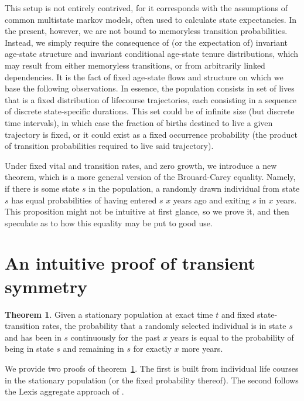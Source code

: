 \documentclass[12pt,oneside,a4paper]{article}
\theoremstyle{definition}
\newtheorem{theorem}{Theorem}[section]
\begin{document}
This setup is not entirely contrived, for it corresponds with the assumptions of
common multistate markov models, often used to calculate state expectancies.
In the present, however, we are not bound to memoryless transition probabilities.
Instead, we simply require the consequence of (or the expectation of) invariant
age-state structure and invariant conditional age-state tenure distributions, which may result from
either memoryless transitions, or from arbitrarily linked
dependencies.
It is the fact of fixed age-state flows and structure on which we base the following observations.
In essence, the population consists in set of lives that is a fixed distribution of lifecourse
trajectories, each consisting in a sequence of discrete state-specific
durations. This set could be of infinite size (but discrete time intervals), in
which case the fraction of births destined to live a given trajectory is fixed,
or it could exist as a fixed occurrence probability (the product of
transition probabilities required to live said trajectory). 

Under fixed vital and transition rates, and zero growth, we introduce a new
theorem, which is a more general version of the Brouard-Carey equality.
Namely, if there is some state $s$ in the population, a
randomly drawn individual from state $s$ has equal probabilities of having
entered $s$ $x$ years ago and exiting $s$ in $x$ years. This proposition
might not be intuitive at first glance, so we prove it, and then speculate
as to how this equality may be put to good use. 

\section{An intuitive proof of transient symmetry}
\FloatBarrier

\begin{theorem}
\label{th}
Given a stationary population at exact time $t$ and fixed state-transition
rates, the probability that a randomly selected individual is in state $s$ and has been in $s$ continuously for the past $x$ years
is equal to the probability of being in state $s$ and remaining in $s$ for exactly $x$ more years.
\end{theorem}

We provide two proofs of theorem~\ref{th}. The first is built from individual life courses in the stationary population (or the fixed probability thereof). The second follows the Lexis aggregate approach of \citet{villavicencioRiffeSymmetires2016}.
\end{document}
